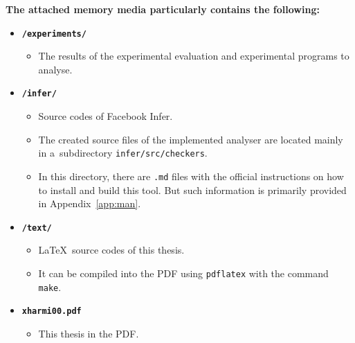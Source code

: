 \textbf{The attached memory media particularly contains the following:}
\begin{itemize}
    \item 
        \texttt{\textbf{/experiments/}}
        
        \begin{itemize}
            \item 
                The results of the experimental evaluation and experimental
                programs to analyse.
        \end{itemize}
        
    \item
        \texttt{\textbf{/infer/}}
        
        \begin{itemize}
            \item 
                Source codes of Facebook Infer.
                
            \item
                The created source files of the implemented analyser are
                located mainly in a~subdirectory \texttt{infer/src/checkers}.
                
            \item
                In this directory, there are \texttt{.md} files with the 
                official instructions on how to install and build this tool.
                But such information is primarily provided in 
                Appendix~\ref{app:man}.
        \end{itemize}
        
    \item
        \texttt{\textbf{/text/}}
        
        \begin{itemize}
            \item 
                \LaTeX\ source codes of this thesis.
            \item 
                It can be compiled into the PDF using \texttt{pdflatex} with
                the command \texttt{make}.
        \end{itemize}
        
    \item
        \texttt{\textbf{xharmi00.pdf}}
        
        \begin{itemize}
            \item This thesis in the PDF.
        \end{itemize}
\end{itemize}



